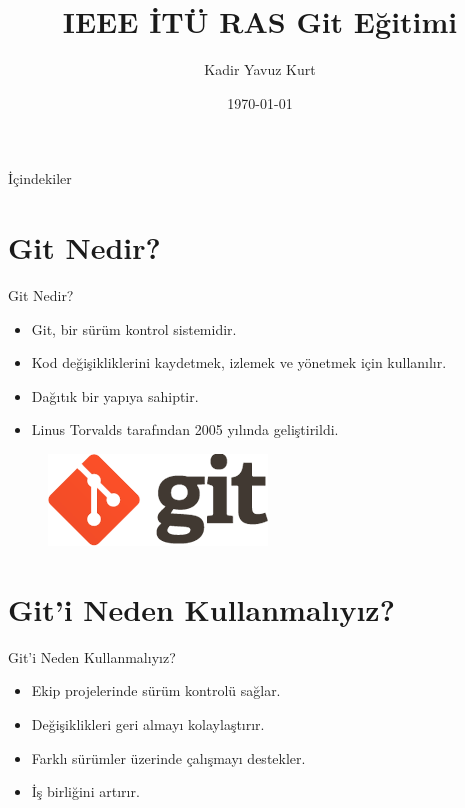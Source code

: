 \documentclass{beamer}
\title{IEEE İTÜ RAS Git Eğitimi}
\author{Kadir Yavuz Kurt}
\institute{IEEE İTÜ RAS}
\date{\today}
\begin{document}
\begin{frame}
    \titlepage
\end{frame}

\begin{frame}{İçindekiler}
    \tableofcontents
\end{frame}

\section{Git Nedir?}
\begin{frame}{Git Nedir?}
    \begin{itemize}
        \item Git, bir sürüm kontrol sistemidir.
        \item Kod değişikliklerini kaydetmek, izlemek ve yönetmek için kullanılır.
        \item Dağıtık bir yapıya sahiptir.
        \item Linus Torvalds tarafından 2005 yılında geliştirildi.
    \end{itemize}
\begin{figure}
    \centering
    \includegraphics[width=0.25\linewidth]{img/git_logo.png}
\end{figure}
\end{frame}

\section{Git'i Neden Kullanmalıyız?}
\begin{frame}{Git'i Neden Kullanmalıyız?}
    \begin{itemize}
        \item Ekip projelerinde sürüm kontrolü sağlar.
        \item Değişiklikleri geri almayı kolaylaştırır.
        \item Farklı sürümler üzerinde çalışmayı destekler.
        \item İş birliğini artırır.
    \end{itemize}
\end{frame}

\end{document}
